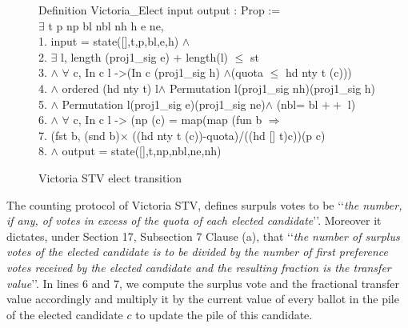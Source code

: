 \documentclass{llncs}
\begin{document}
\begin{scriptsize}
\begin{figure}[b]
{\selectfont
 Definition Victoria\_Elect \textsf{input} \textsf{output} : Prop :=\\ $\exists$ t p np bl nbl nh h e ne, \\
     1. \textsf{input} = \textsf{state}([],t,p,bl,e,h) $\wedge$\\
     2. $\exists$ l, \textsf{length} (proj1\_sig e) $+$ \textsf{length}(l)  $\leq$ st \\
  3. $\wedge$ $\forall$ c, In c l ->(In c (proj1\_sig h) $\wedge$(quota $\leq$ \textsf{hd} nty t (c)))\\
 4.   $\wedge$ \textsf{ordered} (\textsf{hd} nty t) l$\wedge$ \textsf{Permutation} l(proj1\_sig nh)(proj1\_sig h) \\
 5. $\wedge$ \textsf{Permutation} l(proj1\_sig e)(proj1\_sig ne)$\wedge$ (nbl= bl $++$ l)\\
 6. $\wedge$ $\forall$ c, In c l -> (np (c) = \textsf{map}(\textsf{map} (\textsf{fun} b $\Rightarrow$\\ 
 7. (\textsf{fst} b, (\textsf{snd} b)$\times$ ((\textsf{hd} nty t (c))-quota)/((\textsf{hd} [] t)c))(p c)\\
 8. $\wedge$ \textsf{output} = \textsf{state}([],t,np,nbl,ne,nh)
}
\caption{Victoria STV elect transition}
\label{fig;fig.3}
\end{figure}
\end{scriptsize}

The counting protocol of Victoria STV, defines surpuls votes to be \lq\lq \emph{the number, if any, of votes in excess of the
quota of each elected candidate}\rq\rq. Moreover it dictates, under Section 17, Subsection 7 Clause (a), that \lq\lq  \emph{the number of surplus votes of the elected candidate is to be
divided by the number of first preference votes received by the
elected candidate and the resulting fraction is the transfer value}\rq\rq. In lines 6 and 7, we compute the surplus vote and the fractional transfer value accordingly and multiply it by the current value of every ballot in the pile of the elected candidate $c$ to update the pile of this candidate. 
\end{document}

